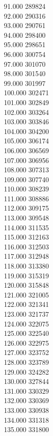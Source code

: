 { 91.000	289824 \\
 92.000	290316 \\
 93.000	290761 \\
 94.000	298400 \\
 95.000	298651 \\
 96.000	300754 \\
 97.000	301070 \\
 98.000	301540 \\
 99.000	301997 \\
 100.000	302471 \\
 101.000	302849 \\
 102.000	303264 \\
 103.000	303846 \\
 104.000	304200 \\
 105.000	306174 \\
 106.000	306569 \\
 107.000	306956 \\
 108.000	307313 \\
 109.000	307740 \\
 110.000	308239 \\
 111.000	308886 \\
 112.000	309175 \\
 113.000	309548 \\
 114.000	311535 \\
 115.000	312163 \\
 116.000	312503 \\
 117.000	312948 \\
 118.000	313380 \\
 119.000	315319 \\
 120.000	315848 \\
 121.000	321005 \\
 122.000	321341 \\
 123.000	321737 \\
 124.000	322075 \\
 125.000	322540 \\
 126.000	322975 \\
 127.000	323752 \\
 128.000	323789 \\
 129.000	324282 \\
 130.000	327844 \\
 131.000	330329 \\
 132.000	330369 \\
 133.000	330938 \\
 134.000	331318 \\
 135.000	331800 \\
}
